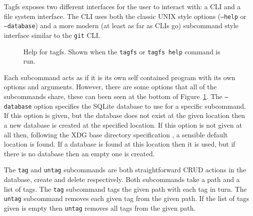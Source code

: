 Tagfs exposes two different interfaces for the user to interact with: a CLI and
a file system interface. The CLI uses both the classic UNIX style options
(\texttt{--help} or \texttt{--database}) and a more modern (at least as far as
CLIs go) subcommand style interface similar to the \texttt{git} CLI.

\begin{figure}[h]
    \centering
    \caption[Help for \texttt{tagfs} CLI]{Help for tagfs. Shown when the
        \texttt{tagfs} or \texttt{tagfs help} command is run.}
    \label{fig:root-cli}
\end{figure}

Each subcommand acts as if it is its own self contained program with its own
options and arguments. However, there are some options that all of the
subcommands share, these can been seen at the bottom of
Figure~\ref{fig:root-cli}. The \texttt{--database} option specifies the SQLite
database to use for a specific subcommand. If this option is given, but the
database does not exist at the given location then a new database is created at
the specified location. If this option is not given at all then, following the
XDG base directory specification \cite{xdg-base-dir-spec}, a sensible default
location is found. If a database is found at this location then it is used, but
if there is no database then an empty one is created.

The \texttt{tag} and \texttt{untag} subcommands are both straightforward CRUD
actions in the database, create and delete respectively. Both subcommands take
a path and a list of tags. The \texttt{tag} subcommand tags the given path with
each tag in turn. The \texttt{untag} subcommand removes each given tag from the
given path. If the list of tags given is empty then \texttt{untag} removes all
tags from the given path.

